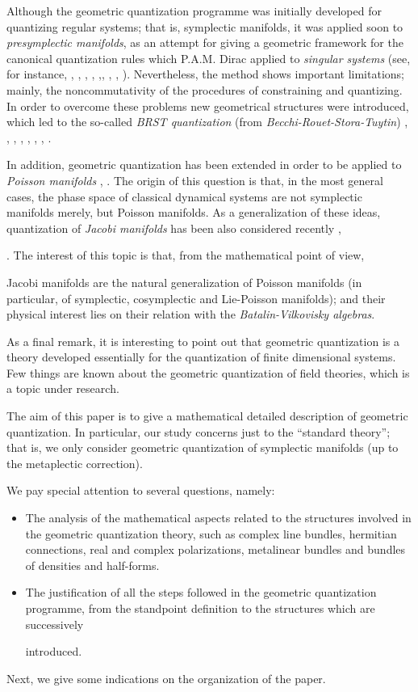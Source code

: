 \documentclass[12pt]{article}
\theoremstyle{plain}
\begin{document}
Although the geometric quantization programme was initially developed
for quantizing regular systems; that is, symplectic manifolds,
it was applied soon to {\it presymplectic manifolds},
as an attempt for giving a geometric framework for the canonical
quantization
rules which P.A.M. Dirac applied to {\it singular systems}
(see, for instance,  \cite{AS-86}, \cite{Blau-88a}, \cite{Blau-88b},
\cite{Go-86},
\cite{GS-81},\cite{Lo-90}, \cite{Ml-89}, \cite{Sn-83}, \cite{Tu-91}).
Nevertheless, the method shows important limitations;
mainly, the noncommutativity of the procedures of constraining
and quantizing. In order to overcome these problems
new geometrical structures were introduced, which led to the so-called
{\it BRST quantization} (from {\it Becchi-Rouet-Stora-Tuytin})
\cite{ALN-90}, \cite{ALN-91}, \cite{DEGST-91}, \cite{Ib-90},
\cite{Ko-77}, \cite{Lo-92},
\cite{Tu-92a}, \cite{Tu-92b}.

In addition, geometric quantization has been extended in order to be
applied to
{\it Poisson manifolds} \cite{Va-91}, \cite{Va-97}.
The origin of this question is that, in the most general cases,
the phase space of classical dynamical systems are not symplectic
manifolds merely,
but Poisson manifolds. As a generalization of these ideas, quantization
of
{\it Jacobi manifolds}  has been also considered recently \cite{CLM-96},

\cite{LMP-97}.
The interest of this topic is that, from the mathematical point of view,

Jacobi manifolds are the natural generalization of Poisson manifolds
(in particular, of symplectic, cosymplectic and Lie-Poisson manifolds);
and their physical interest lies on their relation with the
{\it Batalin-Vilkovisky algebras}.

As a final remark, it is interesting to point out that
geometric quantization is a theory developed essentially
for the quantization of finite dimensional systems.
Few things are known about the geometric quantization of
field theories, which is a topic under research.

The aim of this paper is to give a mathematical detailed description of
geometric quantization. In particular, our study concerns
just to the ``standard theory''; that is, we only consider geometric
quantization
of symplectic manifolds (up to the metaplectic correction).

We pay special attention to several questions, namely:
\begin{itemize}
\item
The analysis of the mathematical aspects related
to the structures involved in the geometric
quantization theory, such as complex line bundles, hermitian
connections,
real and complex polarizations, metalinear bundles and
bundles of densities and half-forms.
\item
The justification of all the steps followed in the geometric
quantization programme,
 from the standpoint definition to the structures which are successively

introduced.
\end{itemize}
Next, we give some indications on the organization of the paper.
\end{document}
